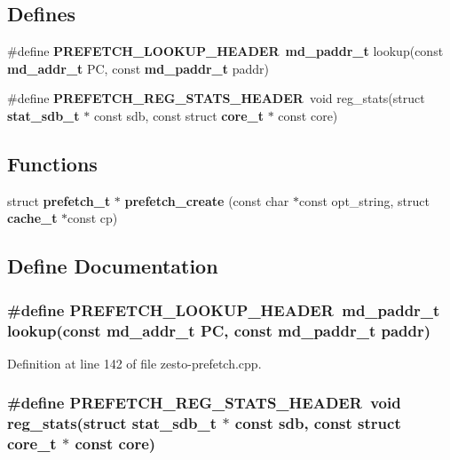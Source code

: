 \subsection*{Defines}
\begin{CompactItemize}
\item 
\#define {\bf PREFETCH\_\-LOOKUP\_\-HEADER}~{\bf md\_\-paddr\_\-t} lookup(const {\bf md\_\-addr\_\-t} PC, const {\bf md\_\-paddr\_\-t} paddr)
\item 
\#define {\bf PREFETCH\_\-REG\_\-STATS\_\-HEADER}~void reg\_\-stats(struct {\bf stat\_\-sdb\_\-t} $\ast$ const sdb, const struct {\bf core\_\-t} $\ast$ const core)
\end{CompactItemize}
\subsection*{Functions}
\begin{CompactItemize}
\item 
struct {\bf prefetch\_\-t} $\ast$ {\bf prefetch\_\-create} (const char $\ast$const opt\_\-string, struct {\bf cache\_\-t} $\ast$const cp)
\end{CompactItemize}


\subsection{Define Documentation}
\subsubsection[{PREFETCH\_\-LOOKUP\_\-HEADER}]{\setlength{\rightskip}{0pt plus 5cm}\#define PREFETCH\_\-LOOKUP\_\-HEADER~{\bf md\_\-paddr\_\-t} lookup(const {\bf md\_\-addr\_\-t} PC, const {\bf md\_\-paddr\_\-t} paddr)}\label{zesto-prefetch_8cpp_418a2fb07ceeb7f482c52cd8151fa400}




Definition at line 142 of file zesto-prefetch.cpp.
\subsubsection[{PREFETCH\_\-REG\_\-STATS\_\-HEADER}]{\setlength{\rightskip}{0pt plus 5cm}\#define PREFETCH\_\-REG\_\-STATS\_\-HEADER~void reg\_\-stats(struct {\bf stat\_\-sdb\_\-t} $\ast$ const sdb, const struct {\bf core\_\-t} $\ast$ const core)}\label{zesto-prefetch_8cpp_ac58baca2b5551ed6a4803ae38afcbb0}




